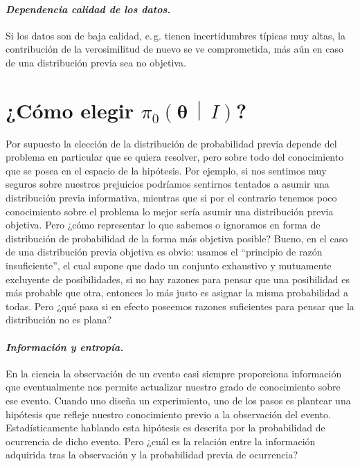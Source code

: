 \documentclass[a4paper,twoside]{article}
\newcommand{\hip}{\ensuremath{\mathbold{\theta}}\xspace}
\newcommand{\pri}[2]{\ensuremath{\pi_0\left(#1\,\middle|\, #2\right)}\xspace}
\begin{document}
\paragraph{\textit{\color{teal}Dependencia calidad de los datos.}} Si los datos son de baja calidad,
e.\,g. tienen incertidumbres típicas muy altas, la contribución de la verosimilitud de nuevo se ve
comprometida, más aún en caso de una distribución previa sea no objetiva.


\section*{¿Cómo elegir \pri{\hip}{I}?}
%
Por supuesto la elección de la distribución de probabilidad previa depende del problema en
particular que se quiera resolver, pero sobre todo del conocimiento que se posea en el espacio de la
hipótesis. Por ejemplo, si nos sentimos muy seguros sobre nuestros prejuicios podríamos sentirnos
tentados a asumir una distribución previa informativa,
mientras que si por el contrario tenemos poco conocimiento sobre el problema lo mejor sería asumir
una distribución previa objetiva.
Pero ¿cómo representar lo que sabemos o ignoramos en forma de distribución de probabilidad de la
forma más objetiva posible? Bueno, en el caso de una distribución previa objetiva es obvio: usamos
el ``principio de razón insuficiente'', el cual supone que dado un conjunto exhaustivo y mutuamente
excluyente de posibilidades, si no hay razones para pensar que una posibilidad es más probable que
otra, entonces lo más justo es asignar la misma probabilidad a todas. Pero ¿qué pasa si en efecto
poseemos razones suficientes para pensar que la distribución no es plana?

\paragraph{\textit{\color{teal}Información y entropía.}} En la ciencia la observación de un evento
casi siempre proporciona información que eventualmente nos permite actualizar nuestro grado de
conocimiento sobre ese evento. Cuando uno diseña un experimiento, uno de los pasos es plantear una
hipótesis que refleje nuestro conocimiento previo a la observación del evento. Estadísticamente
hablando esta hipótesis es descrita por la probabilidad de ocurrencia de dicho evento. Pero ¿cuál es
la relación entre la información adquirida tras la observación y la probabilidad previa de
ocurrencia?
\end{document}

